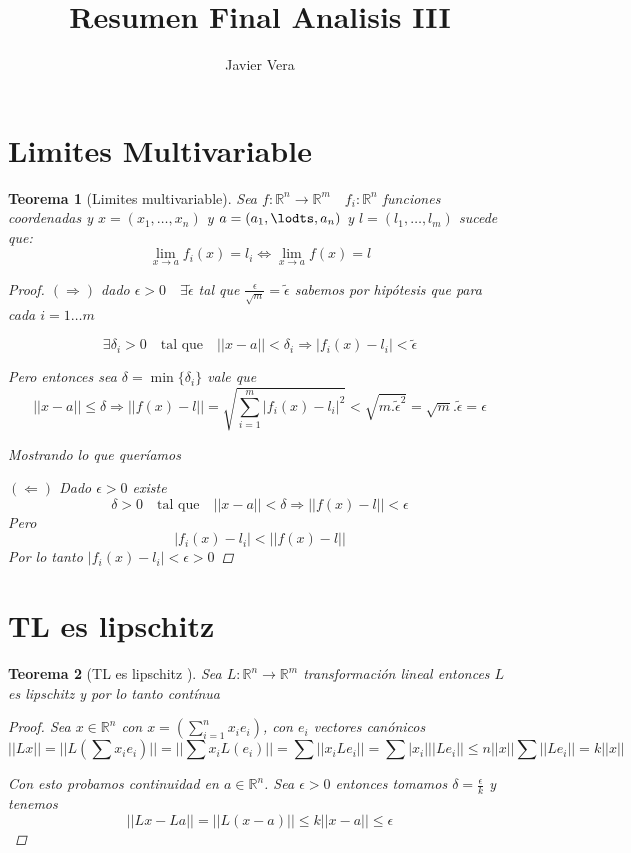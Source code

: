 \documentclass{article}
\theoremstyle{break}
\newtheorem{theorem}{Teorema}[section]
\begin{document}
    
\title{Resumen Final Analisis III}
\author{Javier Vera}
\maketitle
\newpage

\section{Limites Multivariable}
\begin{theorem}[Limites multivariable]
	Sea $f:\mathbb{R}^n \rightarrow \mathbb{R}^m \quad f_i: \mathbb{R}^n $ funciones coordenadas y $x=(x_1,\ldots,x_n)$ y 
	$a=(a_1,\lodts,a_n)$ y $l=(l_1,\ldots , l_m)$ sucede que:
	\[\lim_{x\rightarrow a} f_i(x) = l_i \iff \lim_{x\rightarrow a} f(x) = l\]

	\begin{proof}
		$(\Rightarrow)$ dado $\epsilon >0 \quad \exists \tilde{\epsilon}$ tal que $\frac{\epsilon}{\sqrt{m}}= \tilde{\epsilon} $ 
		sabemos por hipótesis que para cada $i=1\ldots m$

		$$\exists \delta_i > 0 \quad  \text{tal que} \quad  || x - a|| <\delta_i \Rightarrow 
		|f_i(x) - l_i |< \tilde{\epsilon}$$
	  
		Pero entonces sea $\delta = \min\{\delta_i\} $ vale que 
		$$||x-a||\leq \delta \Rightarrow || f(x) - l || = \sqrt{\sum_{i=1}^m |f_i(x) -l_i|^2} < \sqrt{m .\tilde{\epsilon}^2}
		= \sqrt{m}.\tilde{\epsilon} = \epsilon $$

		Mostrando lo que queríamos

		$(\Leftarrow)$ Dado $ \epsilon > 0 $ existe 
		$$ \delta > 0 \quad  \text{tal que} \quad ||x-a|| < \delta \Rightarrow ||f(x) - l|| < \epsilon$$
		Pero $$|f_i(x)-l_i| < ||f(x) - l||$$ 
		Por lo tanto $|f_i(x) - l_i| < \epsilon > 0$
	\end{proof}
	\end{theorem}
\section{TL es lipschitz}
\begin{theorem}[TL es lipschitz ]
  Sea $L :\mathbb{R}^{n} \longrightarrow \mathbb{R}^{m} $ transformación lineal entonces $L$ es lipschitz y 
  por lo tanto contínua 
  \begin{proof}
    Sea $x\in \mathbb{R}^{n} $ con $x=(\sum_{i=1}^n x_i e_i) $, con $e_i$ vectores canónicos
    $$ ||Lx|| = ||L(\sum x_i e_i)|| = ||\sum x_i L(e_i)|| = \sum ||x_iLe_i|| = \sum |x_i|||Le_i||
    \leq n ||x||\sum||Le_i|| = k||x||$$

    Con esto probamos continuidad en $a\in \mathbb{R}^{n} $. Sea $ \epsilon > 0 $ entonces 
    tomamos $\delta = \frac{\epsilon}{k} $ y tenemos
    $$||Lx - La|| = ||L(x-a)|| \leq k ||x-a|| \leq \epsilon  $$ 
  \end{proof}
\end{theorem}
\end{document}
